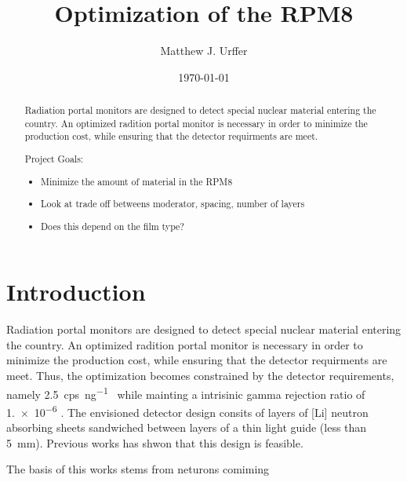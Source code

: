 \documentclass[final,onecolumn]{IEEEtran}
\begin{document}
\title{Optimization of the RPM8}
\author{Matthew J. Urffer}
\date{\today}

\maketitle
\begin{abstract}
Radiation portal monitors are designed to detect special nuclear material entering the country.
An optimized radition portal monitor is necessary in order to minimize the production cost, while ensuring that the detector requirments are meet.

Project Goals:
\begin{itemize}
	\item Minimize the amount of material in the RPM8
	\item Look at trade off betweens moderator, spacing, number of layers
	\item Does this depend on the film type?
\end{itemize}
\end{abstract}

\IEEEpeerreviewmaketitle

\pagebreak
\tableofcontents
\listoftodos
\listoffigures
\listoftables
\lstlistoflistings
\pagebreak

\section{Introduction}
Radiation portal monitors are designed to detect special nuclear material entering the country.
An optimized radition portal monitor is necessary in order to minimize the production cost, while ensuring that the detector requirments are meet.
Thus, the optimization becomes constrained by the detector requirements, namely \SI{2.5}{cps\per\nano\gram{}} while mainting a intrisinic gamma rejection ratio of \num{1.e-6}  \cite{kouzes_neutron_2010,kouzes_neutron_1999}.
The envisioned detector design consits of layers of [Li] neutron absorbing sheets sandwiched between layers of a thin light guide (less than \SI{5}{\milli \meter}).
Previous works has shwon that this design is feasible.

The basis of this works stems from neturons comiming


\pagebreak
\appendix
\end{document}
